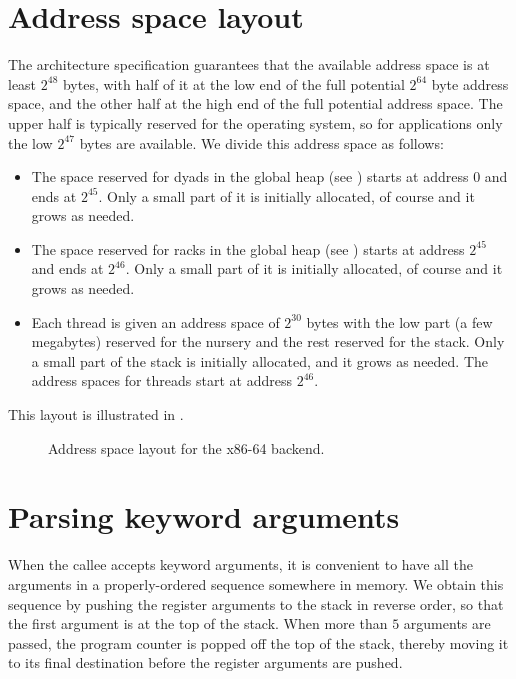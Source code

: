 \section{Address space layout}

The architecture specification guarantees that the available address
space is at least $2^{48}$ bytes, with half of it at the low end of
the full potential $2^{64}$ byte address space, and the other half at
the high end of the full potential address space.  The upper half is
typically reserved for the operating system, so for applications only
the low $2^{47}$ bytes are available.  We divide this address space as
follows:

\begin{itemize}
\item The space reserved for dyads in the global heap (see
  ) starts at address $0$ and ends at
  $2^{45}$.  Only a small part of it is initially allocated, of course
  and it grows as needed.
\item The space reserved for racks in the global heap (see
  ) starts at address $2^{45}$ and ends at
  $2^{46}$.  Only a small part of it is initially allocated, of course
  and it grows as needed.
\item Each thread is given an address space of $2^{30}$ bytes with the
  low part (a few megabytes) reserved for the nursery and the rest
  reserved for the stack.  Only a small part of the stack is initially
  allocated, and it grows as needed.  The address spaces for threads
  start at address $2^{46}$.
\end{itemize}

This layout is illustrated in .

\begin{figure}
\begin{center}
\end{center}
\caption{\label{fig-address-space-x86-64}
Address space layout for the x86-64 backend.}
\end{figure}

\section{Parsing keyword arguments}

When the callee accepts keyword arguments, it is convenient to have
all the arguments in a properly-ordered sequence somewhere in memory.
We obtain this sequence by pushing the register arguments to the stack
in reverse order, so that the first argument is at the top of the
stack.  When more than $5$ arguments are passed, the program counter
is popped off the top of the stack, thereby moving it to its final
destination before the register arguments are pushed.

